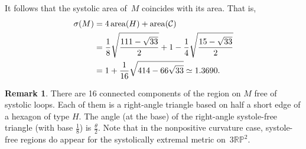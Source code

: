 \documentclass[12pt,reqno]{amsart}
\theoremstyle{definition}
\newtheorem{remark}[theorem]{Remark}
\numberwithin{equation}{section}
\DeclareMathOperator{\area}{{\rm area}}
\newcommand{\RP}{{\mathbb R\mathbb P}}
\numberwithin{equation}{section}
\begin{document}
It follows that the systolic area of~$M$ coincides with its area.
That is,
\begin{align*}
\sigma(M) & = 4 \area(H) + \area(\mathcal{C}) \\
 & = \frac{1}{8} \sqrt{\frac{111-\sqrt{33}}{2}} + 1 - \frac{1}{4} \sqrt{\frac{15-\sqrt{33}}{2}} \\
 & = 1 + \frac{1}{16} \sqrt{414-66 \sqrt{33}} \simeq 1.3690.
\end{align*}


\begin{remark}
There are 16 connected components of the region on $M$ free of
systolic loops.  Each of them is a right-angle triangle based on half
a short edge of a hexagon of type $H$.  The angle (at the base) of the
right-angle systole-free triangle (with base $\frac18$) is
$\frac{\theta}2$.  Note that in the nonpositive curvature case,
systole-free regions do appear for the systolically extremal metric
on~$3\RP^2$.
\end{remark}
\end{document}
